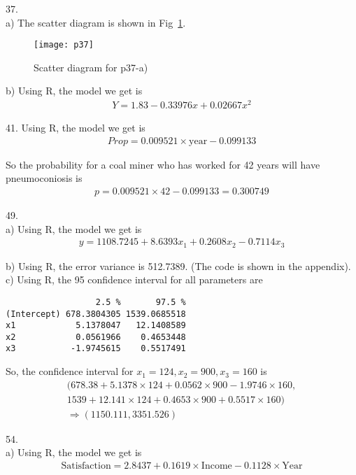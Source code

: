 \documentclass[12pt]{article}
\begin{document}
37. \\
a) The scatter diagram is shown in Fig~\ref{fig:p37}. \\
\begin{figure}[ht!]
  \centering
  \texttt{[image: p37]}
  \caption{Scatter diagram for p37-a) \label{fig:p37}}
\end{figure}

b) Using R, the model we get is
\begin{eqnarray*}
  Y = 1.83 - 0.33976 x + 0.02667 x^2
\end{eqnarray*}

41. Using R, the model we get is
\begin{eqnarray*}
  Prop = 0.009521 \times \text{year} - 0.099133
\end{eqnarray*}

So the probability for a coal miner who has worked for 42 years will have pneumoconiosis is
\begin{eqnarray*}
  p = 0.009521 \times 42 - 0.099133 = 0.300749
\end{eqnarray*}

49. \\
a) Using R, the model we get is
\begin{eqnarray*}
 y = 1108.7245 + 8.6393 x_1 +  0.2608 x_2 - 0.7114 x_3
\end{eqnarray*}

b) Using R, the error variance is 512.7389. (The code is shown in the appendix). \\

c) Using R, the 95 confidence interval for all parameters are
\begin{verbatim}
                  2.5 %       97.5 %
(Intercept) 678.3804305 1539.0685518
x1            5.1378047   12.1408589
x2            0.0561966    0.4653448
x3           -1.9745615    0.5517491
\end{verbatim}

So, the confidence interval for $x_1 = 124, x_2 = 900, x_3 = 160$ is
\begin{eqnarray*}
  (678.38 + 5.1378 \times 124 + 0.0562 \times 900 - 1.9746 \times 160, \\
    1539 + 12.141 \times 124 + 0.4653 \times 900 + 0.5517 \times 160) \\
  \Rightarrow (1150.111,  3351.526)
\end{eqnarray*}

54. \\
a) Using R, the model we get is
\begin{eqnarray*}
  \text{Satisfaction} = 2.8437 + 0.1619 \times \text{Income} - 0.1128 \times \text{Year}
\end{eqnarray*}
\end{document}

